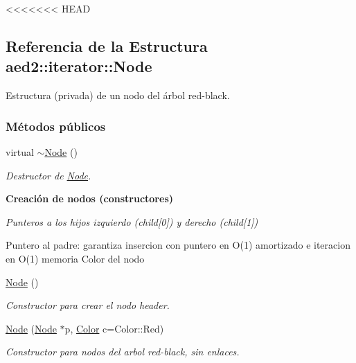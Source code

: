 <<<<<<< HEAD
\hypertarget{structaed2_1_1iterator_1_1Node}{\subsection{\-Referencia de la \-Estructura aed2\-:\-:iterator\-:\-:\-Node}
\label{structaed2_1_1iterator_1_1Node}
}


\-Estructura (privada) de un nodo del árbol red-\/black.  


\subsubsection*{\-Métodos públicos}
\begin{DoxyCompactItemize}
\item 
virtual \hyperlink{structaed2_1_1iterator_1_1Node_ab9a8f2970d15b72a4d1d20f8bf853d4b_ab9a8f2970d15b72a4d1d20f8bf853d4b}{$\sim$\-Node} ()
\begin{DoxyCompactList}\small\item\em \-Destructor de \hyperlink{structaed2_1_1iterator_1_1Node}{\-Node}. \end{DoxyCompactList}\end{DoxyCompactItemize}
\begin{Indent}{\bf \-Creación de nodos (constructores)}\par
{\em \-Punteros a los hijos izquierdo (child\mbox{[}0\mbox{]}) y derecho (child\mbox{[}1\mbox{]})

\-Puntero al padre\-: garantiza insercion con puntero en \-O(1) amortizado e iteracion en \-O(1) memoria \-Color del nodo }\begin{DoxyCompactItemize}
\item 
\hyperlink{structaed2_1_1iterator_1_1Node_a143f108a38e8990d7d60ad48dd521654_a143f108a38e8990d7d60ad48dd521654}{\-Node} ()
\begin{DoxyCompactList}\small\item\em \-Constructor para crear el nodo header. \end{DoxyCompactList}\item 
\hyperlink{structaed2_1_1iterator_1_1Node_a1f7307020ba416915f60d2dd938df845_a1f7307020ba416915f60d2dd938df845}{\-Node} (\hyperlink{structaed2_1_1iterator_1_1Node}{\-Node} $\ast$p, \hyperlink{classaed2_1_1iterator_aaa188f82ba585d8de525b1400242cf4f_aaa188f82ba585d8de525b1400242cf4f}{\-Color} c=\-Color\-::\-Red)
\begin{DoxyCompactList}\small\item\em \-Constructor para nodos del arbol red-\/black, sin enlaces. \end{DoxyCompactList}\end{DoxyCompactItemize}
\end{Indent}

